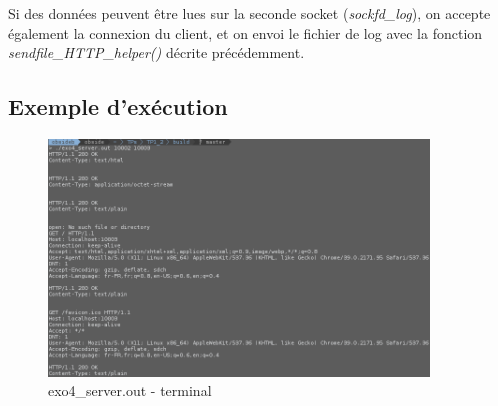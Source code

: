Si des données peuvent être lues sur la seconde socket (\emph{sockfd\_log}), on accepte également la connexion du client, et on envoi le fichier de log avec la fonction \emph{sendfile\_HTTP\_helper()} décrite précédemment.

\newpage
\subsection{Exemple d'exécution}

\begin{figure}[h!]
	\centering
	\includegraphics[width=0.9\textwidth]{screenshots/ex4_terminal.png}
	\caption{exo4\_server.out - terminal}
\end{figure}

